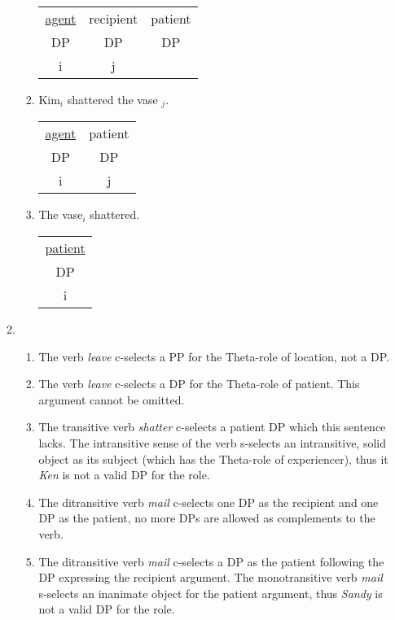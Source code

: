 \documentclass[12pt]{article}
\begin{document}
\begin{enumerate}[label=\textbf{\arabic*.}]
\begin{enumerate}[label=(\arabic*)]
\begin{enumerate}[label=\alph*.]
\begin{tabular}{ |c|c|c| } 
 \hline
 \underline{agent} & recipient & patient \\ 
 DP & DP & DP \\ 
 \hline
 i & j &  \\ 
 \hline
\end{tabular}
\item Kim$_{i}$ shattered the vase $_{j}$.\\
\begin{tabular}{ |c|c| } 
 \hline
 \underline{agent} & patient \\ 
 DP & DP \\ 
 \hline
 i & j \\ 
 \hline
\end{tabular}
\item The vase$_{i}$ shattered.\\
\begin{tabular}{ |c| } 
 \hline
 \underline{patient} \\ 
 DP \\ 
 \hline
 i \\ 
 \hline
\end{tabular}
\end{enumerate}
\item
\begin{enumerate}[label=\alph*.]
\item The verb \emph{leave} c-selects a PP for the Theta-role of location, not a DP.
\item The verb \emph{leave} c-selects a DP for the Theta-role of patient. This argument cannot be omitted.
\item The transitive verb \emph{shatter} c-selects a patient DP which this sentence lacks. The intransitive sense of the verb s-selects an intransitive, solid object as its subject (which has the Theta-role of experiencer), thus it \emph{Ken} is not a valid DP for the role.
\item The ditransitive verb \emph{mail} c-selects one DP as the recipient and one DP as the patient, no more DPs are allowed as complements to the verb.
\item The ditransitive verb \emph{mail} c-selects a DP as the patient following the DP expressing the recipient argument. The monotransitive verb \emph{mail} s-selects an inanimate object for the patient argument, thus \emph{Sandy} is not a valid DP for the role.
\end{enumerate}
\end{enumerate}


\end{enumerate}
\end{document}
